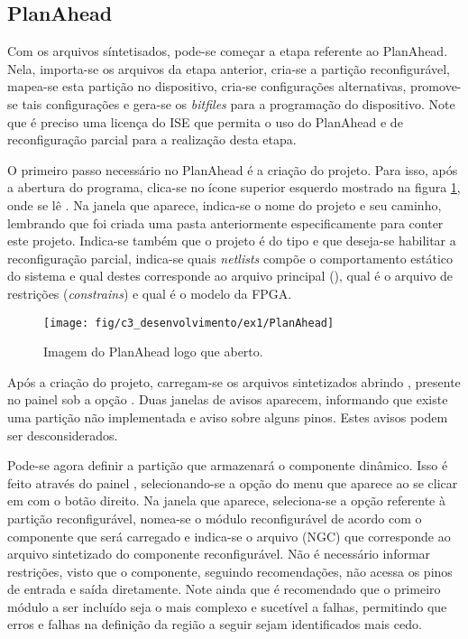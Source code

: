 \documentclass[11pt,a4paper,oneside]{book}
\begin{document}
\subsection{PlanAhead}
Com os arquivos síntetisados, pode-se começar a etapa referente ao PlanAhead.
Nela, importa-se os arquivos da etapa anterior, cria-se a partição reconfigurável, mapea-se esta partição no dispositivo, cria-se configurações alternativas, promove-se tais configurações e gera-se os \textit{bitfiles} para a programação do dispositivo.
Note que é preciso uma licença do ISE que permita o uso do PlanAhead e de reconfiguração parcial para a realização desta etapa.

O primeiro passo necessário no PlanAhead é a criação do projeto.
Para isso, após a abertura do programa, clica-se no ícone superior esquerdo mostrado na figura \ref{fig:ex1:planahead}, onde se lê .
Na janela que aparece, indica-se o nome do projeto e seu caminho, lembrando que foi criada uma pasta anteriormente especificamente para conter este projeto.
Indica-se também que o projeto é do tipo  e que deseja-se habilitar a reconfiguração parcial, indica-se quais \textit{netlists} compõe o comportamento estático do sistema e qual destes corresponde ao arquivo principal (), qual é o arquivo de restrições (\textit{constrains}) e qual é o modelo da FPGA.

\begin{figure}[h]
\centering
\texttt{[image: fig/c3\_desenvolvimento/ex1/PlanAhead]}
\caption{Imagem do PlanAhead logo que aberto.}
\label{fig:ex1:planahead}
\end{figure}

Após a criação do projeto, carregam-se os arquivos sintetizados abrindo , presente no painel  sob a opção .
Duas janelas de avisos aparecem, informando que existe uma partição não implementada e aviso sobre alguns pinos.
Estes avisos podem ser desconsiderados.

Pode-se agora definir a partição que armazenará o componente dinâmico.
Isso é feito através do painel , selecionando-se a opção  do menu que aparece ao se clicar em  com o botão direito.
Na janela que aparece, seleciona-se a opção referente à partição reconfigurável, nomea-se o módulo reconfigurável de acordo com o componente que será carregado e indica-se o arquivo (NGC) que corresponde ao arquivo sintetizado do componente reconfigurável.
Não é necessário informar restrições, visto que o componente, seguindo recomendações, não acessa os pinos de entrada e saída diretamente.
Note ainda que é recomendado que o primeiro módulo a ser incluído seja o mais complexo e sucetível a falhas, permitindo que erros e falhas na definição da região a seguir sejam identificados mais cedo.
\end{document}
